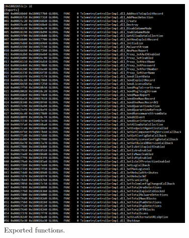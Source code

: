 \begin{figure}
  \centering
  \includegraphics[width=0.85\textwidth]{./figures/ExportedFunction}
  \caption{\label{fig:ExportedFunction} Exported functions.}
\end{figure}

